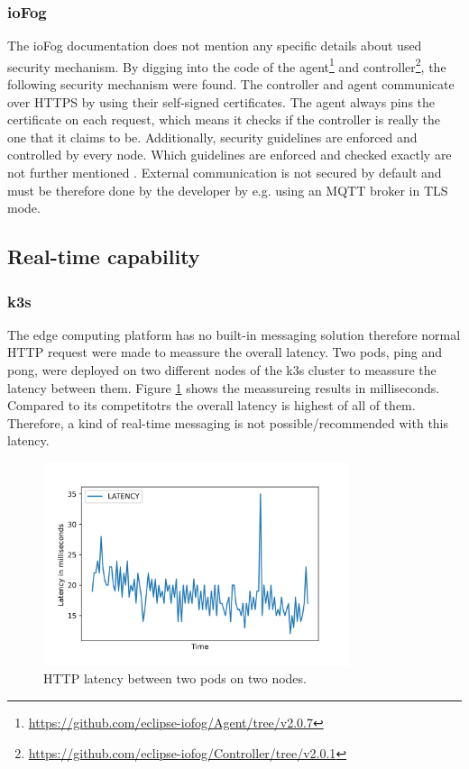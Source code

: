 \subsubsection*{ioFog}
The ioFog documentation does not mention any specific details about used security mechanism. By digging into the code of the agent\footnote{\url{https://github.com/eclipse-iofog/Agent/tree/v2.0.7}} and controller\footnote{\url{https://github.com/eclipse-iofog/Controller/tree/v2.0.1}}, the following security mechanism were found. The controller and agent communicate over HTTPS by using their self-signed certificates. The agent always pins the certificate on each request, which means it checks if the controller is really the one that it claims to be. Additionally, security guidelines are enforced and controlled by every node. Which guidelines are enforced and checked exactly are not further mentioned \cite{Marshall2019}. External communication is not secured by default and must be therefore done by the developer by e.g. using an MQTT broker in TLS mode.

\subsection*{Real-time capability}
\subsubsection*{k3s}
The edge computing platform has no built-in messaging solution therefore normal HTTP request were made to meassure the overall latency. Two pods, ping and pong, were deployed on two different nodes of the k3s cluster to meassure the latency between them. Figure \ref{fig:k3s-latency} shows the meassureing results in milliseconds. Compared to its competitotrs the overall latency is highest of all of them. Therefore, a kind of real-time messaging is not possible/recommended with this latency.

\begin{figure}[H]
    \centering
    \includegraphics[width=0.8\textwidth]{assets/k3s/latency/plots/latency.png}
    \caption{HTTP latency between two pods on two nodes.}\label{fig:k3s-latency}
\end{figure}

